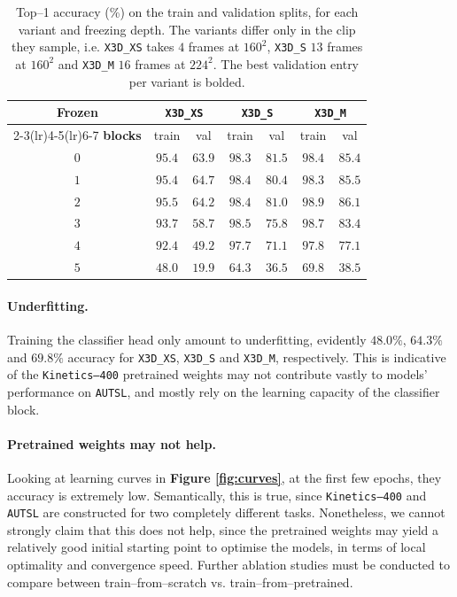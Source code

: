 \begin{table}[H]
\centering\small
\begin{tabular}{@{}c cc cc cc@{}}
\toprule
\textbf{Frozen} & \multicolumn{2}{c}{\texttt{X3D\_XS}} & \multicolumn{2}{c}{\texttt{X3D\_S}} & \multicolumn{2}{c}{\texttt{X3D\_M}} \\
\cmidrule(lr){2-3}\cmidrule(lr){4-5}\cmidrule(lr){6-7}
\textbf{blocks} & train & val & train & val & train & val \\
\midrule
$0$ & $95.4$ & $63.9$ & $98.3$ & $\mathbf{81.5}$ & $98.4$ & $85.4$ \\
$1$ & $95.4$ & $\mathbf{64.7}$ & $98.4$ & $80.4$ & $98.3$ & $85.5$ \\
$2$ & $95.5$ & $64.2$ & $98.4$ & $81.0$ & $98.9$ & $\mathbf{86.1}$ \\
$3$ & $93.7$ & $58.7$ & $98.5$ & $75.8$ & $98.7$ & $83.4$ \\
$4$ & $92.4$ & $49.2$ & $97.7$ & $71.1$ & $97.8$ & $77.1$ \\
$5$ & $48.0$ & $19.9$ & $64.3$ & $36.5$ & $69.8$ & $38.5$ \\
\bottomrule
\end{tabular}
\caption{Top--1 accuracy (\%) on the train and validation splits, for each variant and freezing depth. The variants differ only in the clip they sample, i.e. \texttt{X3D\_XS} takes $4$ frames at $160^2$, \texttt{X3D\_S} $13$ frames at $160^2$ and \texttt{X3D\_M} $16$ frames at $224^2$. The best validation entry per variant is bolded.}
\label{tab:val_sweep}
\end{table}

\paragraph{Underfitting.} Training the classifier head only amount to underfitting, evidently $48.0\%$, $64.3\%$ and $69.8\%$ accuracy for \texttt{X3D\_XS}, \texttt{X3D\_S} and \texttt{X3D\_M}, respectively.
This is indicative of the \texttt{Kinetics–400} pretrained weights may not contribute vastly to models' performance on \texttt{AUTSL}, and mostly rely on the learning capacity of the classifier block.

\paragraph{Pretrained weights may not help.} Looking at learning curves in \textbf{Figure \ref{fig:curves}}, at the first few epochs, they accuracy is extremely low.
Semantically, this is true, since \texttt{Kinetics–400} and \texttt{AUTSL} are constructed for two completely different tasks. Nonetheless, we cannot strongly claim that this does not help, since the pretrained weights may yield a relatively good initial starting point to optimise the models, in terms of local optimality and convergence speed.
Further ablation studies must be conducted to compare between train–from–scratch vs. train–from–pretrained.

